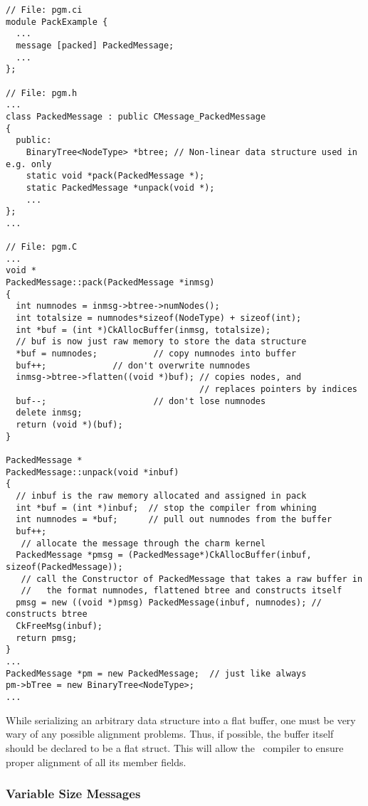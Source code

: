 \begin{verbatim}
// File: pgm.ci
module PackExample {
  ...
  message [packed] PackedMessage;
  ...
};

// File: pgm.h
...
class PackedMessage : public CMessage_PackedMessage
{
  public:
    BinaryTree<NodeType> *btree; // Non-linear data structure used in e.g. only 
    static void *pack(PackedMessage *);
    static PackedMessage *unpack(void *);
    ...
};
...

// File: pgm.C
...
void *
PackedMessage::pack(PackedMessage *inmsg)
{
  int numnodes = inmsg->btree->numNodes();
  int totalsize = numnodes*sizeof(NodeType) + sizeof(int);
  int *buf = (int *)CkAllocBuffer(inmsg, totalsize);
  // buf is now just raw memory to store the data structure 
  *buf = numnodes;           // copy numnodes into buffer 
  buf++;		     // don't overwrite numnodes 
  inmsg->btree->flatten((void *)buf); // copies nodes, and 
                                      // replaces pointers by indices
  buf--;                     // don't lose numnodes  
  delete inmsg;
  return (void *)(buf);
}

PackedMessage *
PackedMessage::unpack(void *inbuf)
{
  // inbuf is the raw memory allocated and assigned in pack 
  int *buf = (int *)inbuf;  // stop the compiler from whining 
  int numnodes = *buf;      // pull out numnodes from the buffer 
  buf++; 
   // allocate the message through the charm kernel      
  PackedMessage *pmsg = (PackedMessage*)CkAllocBuffer(inbuf, sizeof(PackedMessage));
   // call the Constructor of PackedMessage that takes a raw buffer in 
   //   the format numnodes, flattened btree and constructs itself 
  pmsg = new ((void *)pmsg) PackedMessage(inbuf, numnodes); // constructs btree
  CkFreeMsg(inbuf);
  return pmsg; 
}
... 
PackedMessage *pm = new PackedMessage;  // just like always 
pm->bTree = new BinaryTree<NodeType>; 
...
\end{verbatim}


While serializing an arbitrary data structure into a flat buffer, one
must be very wary of any possible alignment problems.  Thus, if
possible, the buffer itself should be declared to be a flat struct.
This will allow the \CC\ compiler to ensure proper alignment of all
its member fields.


\subsubsection{Variable Size Messages}
\label{varsize messages}

